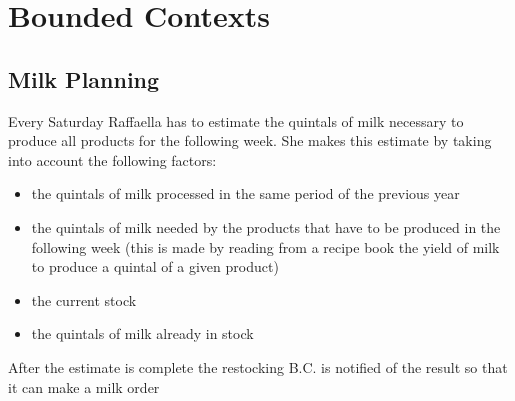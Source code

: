 \chapter{Bounded Contexts}


\section{Milk Planning}
Every Saturday Raffaella has to estimate the quintals of milk necessary to produce all products
for the following week.
She makes this estimate by taking into account the following factors:

\begin{itemize}
    \item the quintals of milk processed in the same period of the previous year
    \item the quintals of milk needed by the products that have to be produced in the following week
    (this is made by reading from a recipe book the yield of milk to produce a quintal of a given product)
    \item the current stock
    \item the quintals of milk already in stock

\end{itemize}

After the estimate is complete the restocking B.C. is notified of the result so
that it can make a milk order

